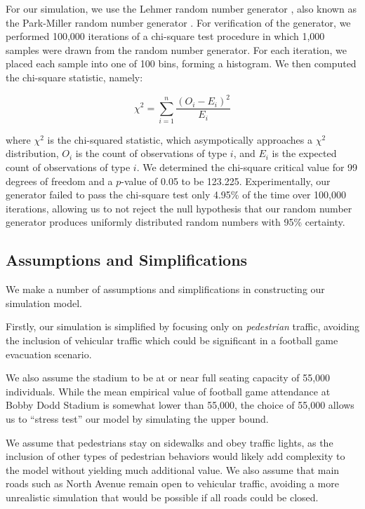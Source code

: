 \documentclass[12pt]{article}
\begin{document}
For our simulation, we use the Lehmer random number generator
\cite{payne1969coding}, also known as the Park-Miller random number generator
\cite{park1988random}. For verification of the generator, we performed
100,000 iterations of a chi-square test procedure in which 1,000 samples were
drawn from the random number generator. For each iteration, we placed each
sample into one of 100 bins, forming a histogram. We then computed the
chi-square statistic, namely:

\begin{equation}
{\chi}^2=\sum_{i=1}^{n} \frac{(O_i - E_i)^2}{E_i}
\end{equation}

where ${\chi}^2$ is the chi-squared statistic, which asympotically approaches
a ${\chi}^2$ distribution, $O_i$ is the count of observations of type $i$,
and $E_i$ is the expected count of observations of type $i$. We determined the
chi-square critical value for 99 degrees of freedom and a $p$-value of 0.05 to be
123.225. Experimentally, our generator failed to pass the chi-square test only
4.95\% of the time over 100,000 iterations, allowing us to not reject the null
hypothesis that our random number generator produces uniformly distributed
random numbers with 95\% certainty.

\subsection{Assumptions and Simplifications}
We make a number of assumptions and simplifications in constructing our
simulation model.

Firstly, our simulation is simplified by focusing only on
\textit{pedestrian} traffic, avoiding the inclusion of vehicular traffic which
could be significant in a football game evacuation scenario.

We also assume the stadium to be at or near full seating capacity of 55,000
individuals. While the mean empirical value of football game attendance at
Bobby Dodd Stadium is somewhat lower than 55,000, the choice
of 55,000 allows us to ``stress test'' our model by simulating the upper bound.

We assume that pedestrians stay on sidewalks and obey traffic lights, as the
inclusion of other types of pedestrian behaviors would likely add complexity
to the model without yielding much additional value. We also assume that main
roads such as North Avenue remain open to vehicular traffic, avoiding a more
unrealistic simulation that would be possible if all roads could be closed.
\end{document}
